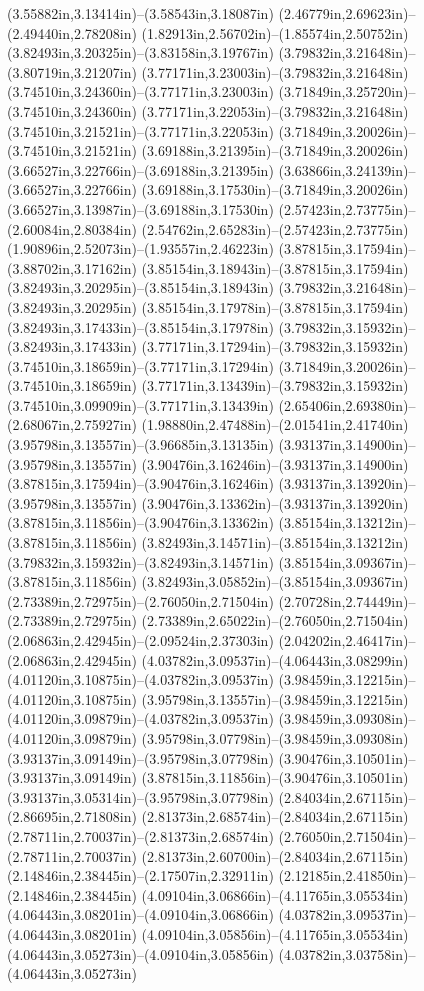 (3.55882in,3.13414in)--(3.58543in,3.18087in) (2.46779in,2.69623in)--(2.49440in,2.78208in) (1.82913in,2.56702in)--(1.85574in,2.50752in) (3.82493in,3.20325in)--(3.83158in,3.19767in) (3.79832in,3.21648in)--(3.80719in,3.21207in) (3.77171in,3.23003in)--(3.79832in,3.21648in) (3.74510in,3.24360in)--(3.77171in,3.23003in) (3.71849in,3.25720in)--(3.74510in,3.24360in) (3.77171in,3.22053in)--(3.79832in,3.21648in) (3.74510in,3.21521in)--(3.77171in,3.22053in) (3.71849in,3.20026in)--(3.74510in,3.21521in) (3.69188in,3.21395in)--(3.71849in,3.20026in) (3.66527in,3.22766in)--(3.69188in,3.21395in) (3.63866in,3.24139in)--(3.66527in,3.22766in) (3.69188in,3.17530in)--(3.71849in,3.20026in) (3.66527in,3.13987in)--(3.69188in,3.17530in) (2.57423in,2.73775in)--(2.60084in,2.80384in) (2.54762in,2.65283in)--(2.57423in,2.73775in) (1.90896in,2.52073in)--(1.93557in,2.46223in) (3.87815in,3.17594in)--(3.88702in,3.17162in) (3.85154in,3.18943in)--(3.87815in,3.17594in) (3.82493in,3.20295in)--(3.85154in,3.18943in) (3.79832in,3.21648in)--(3.82493in,3.20295in) (3.85154in,3.17978in)--(3.87815in,3.17594in) (3.82493in,3.17433in)--(3.85154in,3.17978in) (3.79832in,3.15932in)--(3.82493in,3.17433in) (3.77171in,3.17294in)--(3.79832in,3.15932in) (3.74510in,3.18659in)--(3.77171in,3.17294in) (3.71849in,3.20026in)--(3.74510in,3.18659in) (3.77171in,3.13439in)--(3.79832in,3.15932in) (3.74510in,3.09909in)--(3.77171in,3.13439in) (2.65406in,2.69380in)--(2.68067in,2.75927in) (1.98880in,2.47488in)--(2.01541in,2.41740in) (3.95798in,3.13557in)--(3.96685in,3.13135in) (3.93137in,3.14900in)--(3.95798in,3.13557in) (3.90476in,3.16246in)--(3.93137in,3.14900in) (3.87815in,3.17594in)--(3.90476in,3.16246in) (3.93137in,3.13920in)--(3.95798in,3.13557in) (3.90476in,3.13362in)--(3.93137in,3.13920in) (3.87815in,3.11856in)--(3.90476in,3.13362in) (3.85154in,3.13212in)--(3.87815in,3.11856in) (3.82493in,3.14571in)--(3.85154in,3.13212in) (3.79832in,3.15932in)--(3.82493in,3.14571in) (3.85154in,3.09367in)--(3.87815in,3.11856in) (3.82493in,3.05852in)--(3.85154in,3.09367in) (2.73389in,2.72975in)--(2.76050in,2.71504in) (2.70728in,2.74449in)--(2.73389in,2.72975in) (2.73389in,2.65022in)--(2.76050in,2.71504in) (2.06863in,2.42945in)--(2.09524in,2.37303in) (2.04202in,2.46417in)--(2.06863in,2.42945in) (4.03782in,3.09537in)--(4.06443in,3.08299in) (4.01120in,3.10875in)--(4.03782in,3.09537in) (3.98459in,3.12215in)--(4.01120in,3.10875in) (3.95798in,3.13557in)--(3.98459in,3.12215in) (4.01120in,3.09879in)--(4.03782in,3.09537in) (3.98459in,3.09308in)--(4.01120in,3.09879in) (3.95798in,3.07798in)--(3.98459in,3.09308in) (3.93137in,3.09149in)--(3.95798in,3.07798in) (3.90476in,3.10501in)--(3.93137in,3.09149in) (3.87815in,3.11856in)--(3.90476in,3.10501in) (3.93137in,3.05314in)--(3.95798in,3.07798in) (2.84034in,2.67115in)--(2.86695in,2.71808in) (2.81373in,2.68574in)--(2.84034in,2.67115in) (2.78711in,2.70037in)--(2.81373in,2.68574in) (2.76050in,2.71504in)--(2.78711in,2.70037in) (2.81373in,2.60700in)--(2.84034in,2.67115in) (2.14846in,2.38445in)--(2.17507in,2.32911in) (2.12185in,2.41850in)--(2.14846in,2.38445in) (4.09104in,3.06866in)--(4.11765in,3.05534in) (4.06443in,3.08201in)--(4.09104in,3.06866in) (4.03782in,3.09537in)--(4.06443in,3.08201in) (4.09104in,3.05856in)--(4.11765in,3.05534in) (4.06443in,3.05273in)--(4.09104in,3.05856in) (4.03782in,3.03758in)--(4.06443in,3.05273in) 